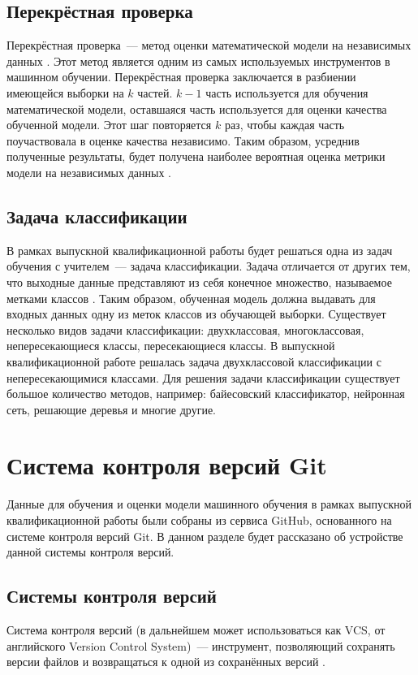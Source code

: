     \subsection{Перекрёстная проверка}
Перекрёстная проверка~--- метод оценки математической модели на независимых данных \cite{cross-validation-article}. Этот метод является одним из самых используемых инструментов в машинном обучении. Перекрёстная проверка заключается в разбиении имеющейся выборки на $k$ частей. $k - 1$ часть используется для обучения математической модели, оставшаяся часть используется для оценки качества обученной модели. Этот шаг повторяется $k$ раз, чтобы каждая часть поучаствовала в оценке качества независимо. Таким образом, усреднив полученные результаты, будет получена наиболее вероятная оценка метрики модели на независимых данных \cite{cross-validation-non-main}.
    \subsection{Задача классификации}
В рамках выпускной квалификационной работы будет решаться одна из задач обучения с учителем~--- задача классификации. Задача отличается от других тем, что выходные данные представляют из себя конечное множество, называемое метками классов \cite{classification-task}. Таким образом, обученная модель должна выдавать для входных данных одну из меток классов из обучающей выборки. Существует несколько видов задачи классификации: двухклассовая, многоклассовая, непересекающиеся классы, пересекающиеся классы. В выпускной квалификационной работе решалась задача двухклассовой классификации с непересекающимися классами. Для решения задачи классификации существует большое количество методов, например: байесовский классификатор, нейронная сеть, решающие деревья и многие другие.
\section{Система контроля версий Git}
Данные для обучения и оценки модели машинного обучения в рамках выпускной квалификационной работы были собраны из сервиса GitHub, основанного на системе контроля версий Git. В данном разделе будет рассказано об устройстве данной системы контроля версий.
    \subsection{Системы контроля версий}
Система контроля версий (в дальнейшем может использоваться как VCS, от английского Version Control System)~--- инструмент, позволяющий сохранять версии файлов и возвращаться к одной из сохранённых версий \cite{vcs-definition}.

